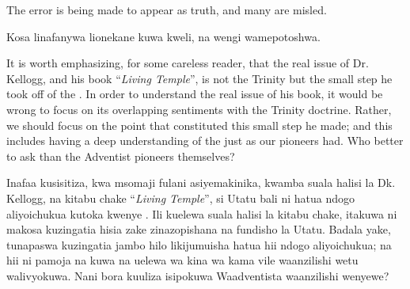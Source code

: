 The error is being made to appear as truth, and many are misled.


Kosa linafanywa lionekane kuwa kweli, na wengi wamepotoshwa.


It is worth emphasizing, for some careless reader, that the real issue of Dr. Kellogg, and his book “\textit{Living Temple}”, is not the Trinity but the small step he took off of the . In order to understand the real issue of his book, it would be wrong to focus on its overlapping sentiments with the Trinity doctrine. Rather, we should focus on the point that constituted this small step he made; and this includes having a deep understanding of the  just as our pioneers had. Who better to ask than the Adventist pioneers themselves?


Inafaa kusisitiza, kwa msomaji fulani asiyemakinika, kwamba suala halisi la Dk. Kellogg, na kitabu chake “\textit{Living Temple}”, si Utatu bali ni hatua ndogo aliyoichukua kutoka kwenye . Ili kuelewa suala halisi la kitabu chake, itakuwa ni makosa kuzingatia hisia zake zinazopishana na fundisho la Utatu. Badala yake, tunapaswa kuzingatia jambo hilo likijumuisha hatua hii ndogo aliyoichukua; na hii ni pamoja na kuwa na uelewa wa kina wa  kama vile waanzilishi wetu walivyokuwa. Nani bora kuuliza isipokuwa Waadventista waanzilishi wenyewe?







